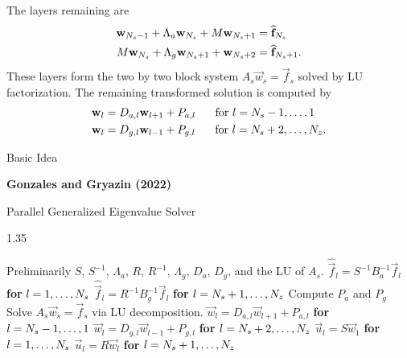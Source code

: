 \documentclass[handout]{beamer}
\begin{document}
\begin{frame}
The layers remaining are 
\begin{align*}
\vec{w}_{\ns-1}+\Lambda_a\vec{w}_\ns+M\vec{w}_{\ns+1}&= \hat{\vec{f}}_\ns \\
%
M\vec{w}_{\ns}+\Lambda_g\vec{w}_{\ns+1}+\vec{w}_{\ns+2}&= \hat{\vec{f}}_{\ns+1}.
\end{align*}
These layers form the two by two block system $A_s\vec{w}_s=\vec{f}_s$ solved by LU factorization. The remaining transformed solution is computed by 
\begin{align*}
\mathbf{w}_l &= D_{a,l}\mathbf{w}_{l+1} + P_{a,l}\hspace{5mm}\text{ for }l={N_s}-1,\dots,1\\
\mathbf{w}_l &= D_{g,l}\mathbf{w}_{l-1} + P_{g,l}\hspace{5mm}\text{ for }l={N_s}+2,\dots,{N_z}.
\end{align*}
\end{frame}

\begin{frame}{Basic Idea}
\twoDimensionalDomainVariableKyGridSolver

\textbf{Gonzales and Gryazin (2022)}
\end{frame}


\newcommand{\myfor}[2]{\STATE #2 \tab \textbf{for } {#1} }
\newcommand{\algorithmSpacing}{1.35} %

\begin{frame}{Parallel Generalized Eigenvalue Solver}
\begin{algorithm}[H]
\caption{Parallel Generalized Eigenvalue Solver}\label{alg:general_eigenvalue_solver}
\begin{spacing}{\algorithmSpacing}
\begin{algorithmic}[1]
\STATE Preliminarily $S$, $S^{-1}$,  $\Lambda_a$, $R$, $R^{-1}$, $\Lambda_g$, $D_a$, $D_g$, and the LU of $A_s$.
\myfor{$l=1,\dots, {N_s}$}{$\hat{\vec{f}}_l = S^{-1}B_a^{-1}\vec{f}_l$}
\myfor{$l={N_s}+1,\dots, {N_z}$}{$\hat{\vec{f}}_l = R^{-1}B_g^{-1}\vec{f}_l$}
\STATE Compute $P_a$ and $P_g$
\STATE Solve $A_s\vec{w}_s = \vec{f}_s$ via LU decomposition.
\myfor{$l={N_s}-1,\dots, 1$}{$\vec{w}_l = D_{a,l}\vec{w}_{l+1} + P_{a,l}$}
\myfor{$l={N_s}+2,\dots, {N_z}$}{$\vec{w}_l = D_{g,l}\vec{w}_{l-1} + P_{g,l}$}
\myfor{$l=1,\dots, {N_s}$}{$\vec{u}_l = S\vec{w}_1$}
\myfor{$l={N_s}+1,\dots, {N_z}$}{$\vec{u}_l = R\vec{w}_l$}
\end{algorithmic}
\end{spacing}
\end{algorithm}
\end{frame}
\end{document}
